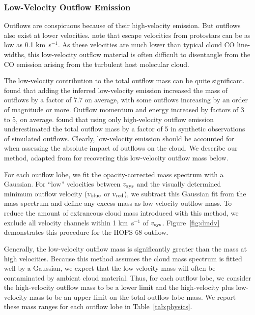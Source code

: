 \documentclass[twocolumn]{aastex63}
\newcommand{\example}{HOPS 68}
\newcommand{\kms}{km~s$^{-1}$}
\begin{document}
\subsubsection{Low-Velocity Outflow Emission}\label{sec:lowvelocity}
Outflows are conspicuous because of their high-velocity emission. But outflows also exist at lower velocities. \citet{Dunham14} note that escape velocities from protostars can be as low as 0.1 \kms. As these velocities are much lower than typical cloud CO line-widths, this low-velocity outflow material is often difficult to disentangle from the CO emission arising from the turbulent host molecular cloud.  

The low-velocity contribution to the total outflow mass can be quite significant. \citet{Dunham14} found that adding the inferred low-velocity emission increased the mass of outflows by a factor of 7.7 on average, with some outflows increasing by an order of magnitude or more. Outflow momentum and energy increased by factors of 3 to 5, on average. \citet{Offner11} found that using only high-velocity outflow emission underestimated the total outflow mass by a factor of 5 in synthetic observations of simulated outflows. Clearly, low-velocity emission should be accounted for when assessing the absolute impact of outflows on the cloud. We describe our method, adapted from \citet{Dunham14} for recovering this low-velocity outflow mass below. 

For each outflow lobe, we fit the opacity-corrected mass spectrum with a Gaussian. For ``low'' velocities between $v_{\rm sys}$ and the visually determined minimum outflow velocity ($v_{\rm blue}$ or $v_{\rm red}$), we subtract this Gaussian fit from the mass spectrum and define any excess mass as low-velocity outflow mass. To reduce the amount of extraneous cloud mass introduced with this method, we exclude all velocity channels within 1 \kms{} of $v_{\rm sys}$. Figure~\ref{fig:dmdv} demonstrates this procedure for the \example{} outflow. 

Generally, the low-velocity outflow mass is significantly greater than the mass at high velocities. Because this method assumes the cloud mass spectrum is fitted well by a Gaussian, we expect that the low-velocity mass will often be contaminated by ambient cloud material. Thus, for each outflow lobe, we consider the high-velocity outflow mass to be a lower limit and the high-velocity plus low-velocity mass to be an upper limit on the total outflow lobe mass. We report these mass ranges for each outflow lobe in Table~\ref{tab:physics}.
\end{document}
